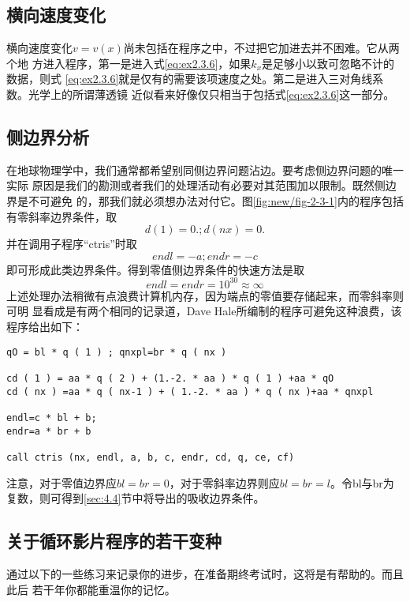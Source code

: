 \subsection{横向速度变化}
横向速度变化$v=v(x)$尚未包括在程序之中，不过把它加进去并不困难。它从两个地
方进入程序，第一是进入式\ref{eq:ex2.3.6}，如果$k_x$是足够小以致可忽略不计的数据，则式
\ref{eq:ex2.3.6}就是仅有的需要该项速度之处。第二是进入三对角线系数。光学上的所谓薄透镜
近似看来好像仅只相当于包括式\ref{eq:ex2.3.6}这一部分。

\subsection{侧边界分析}
在地球物理学中，我们通常都希望别同侧边界问题沾边。要考虑侧边界问题的唯一实际
原因是我们的勘测或者我们的处理活动有必要对其范围加以限制。既然侧边界是不可避免
的，那我们就必须想办法对付它。图\ref{fig:new/fig-2-3-1}内的程序包括有零斜率边界条件，取
\begin{equation*}
d(1)=0.; d(nx)=0.
\end{equation*}
并在调用子程序“ctris”时取
\begin{equation*}
endl= -a ; endr = -c
\end{equation*}
即可形成此类边界条件。得到零值侧边界条件的快速方法是取
\begin{equation*}
endl = endr = 10^{30}\approx\infty
\end{equation*}
上述处理办法稍微有点浪费计算机内存，因为端点的零值要存储起来，而零斜率则可明
显看成是有两个相同的记录道，Dave
Hale所编制的程序可避免这种浪费，该程序给出如下：
\begin{verbatim}
qO = bl * q ( 1 ) ; qnxpl=br * q ( nx ) 

cd ( 1 ) = aa * q ( 2 ) + (1.-2. * aa ) * q ( 1 ) +aa * qO
cd ( nx ) =aa * q ( nx-1 ) + ( 1.-2. * aa ) * q ( nx )+aa * qnxpl

endl=c * bl + b; 
endr=a * br + b

call ctris (nx, endl, a, b, c, endr, cd, q, ce, cf)
\end{verbatim}
注意，对于零值边界应$bl=br=0$，对于零斜率边界则应$bl=br=
l$。令bl与br为复数，则可得到\ref{sec:4.4}节中将导出的吸收边界条件。

\subsection{关于循环影片程序的若干变种}
通过以下的一些练习来记录你的进步，在准备期终考试时，这将是有帮助的。而且此后
若干年你都能重温你的记忆。

